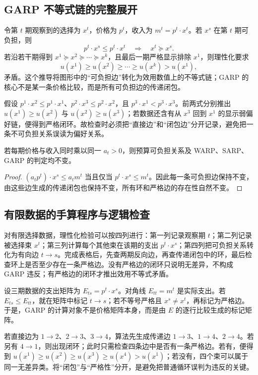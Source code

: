 \subsection{GARP 不等式链的完整展开}
令第 $t$ 期观察到的选择为 $x^t$，价格为 $p^t$，收入为 $m^t=p^t\cdot x^t$。若 $x^s$ 在第 $t$ 期可负担，则
\[
 p^t\cdot x^s\le p^t\cdot x^t
 \quad\Longrightarrow\quad x^t\succeq x^s.
\]
若沿若干期得到 $x^1\succeq x^2\succeq\cdots\succeq x^k$，且最后一期严格显示排除 $x^1$，则理性化要求
\[
 u(x^1)\ge u(x^2)\ge\cdots\ge u(x^k)>u(x^1),
\]
矛盾。这个推导将图形中的“可负担边”转化为效用数值上的不等式链；GARP 的核心不是某一条价格比较，而是所有可负担边的传递闭包。

\begin{example}[三期链的逐项计算]
假设 $p^1\cdot x^2\le p^1\cdot x^1$、$p^2\cdot x^3\le p^2\cdot x^2$，且
$p^3\cdot x^1<p^3\cdot x^3$。前两式分别推出 $u(x^1)\ge u(x^2)$ 与
$u(x^2)\ge u(x^3)$；若数据还含有从 $x^3$ 回到 $x^1$ 的显示弱偏好链，便得到严格闭环。故检查时必须把“直接边”和“闭包边”分开记录，避免把一条不可负担关系误读为偏好关系。
\end{example}

\begin{proposition}[尺度变换不改变显示偏好]
若每期价格与收入同时乘以同一 $a_t>0$，则预算可负担关系及 WARP、SARP、GARP 的判定均不变。
\end{proposition}
\begin{proof}
$(a_tp^t)\cdot x^s\le a_tm^t$ 当且仅当 $p^t\cdot x^s\le m^t$。因此每一条可负担边保持不变，由这些边生成的传递闭包也保持不变，所有环和严格边的存在性自然不变。
\end{proof}

\subsection{有限数据的手算程序与逻辑检查}
对有限选择数据，理性化检验可以按四列进行：第一列记录观察期 $t$；第二列记录被选择束 $x^t$；第三列计算每个其他束在该期的支出 $p^t\cdot x^s$；第四列把可负担关系转化为有向边 $t\to s$。完成表格后，先查两期反向边，再查传递闭包中的环，最后检查环上是否至少存在一条严格边。没有严格边的闭环只说明无差异，不构成 GARP 违反；有严格边的闭环才推出效用不等式矛盾。

设三期数据的支出矩阵为 $E_{ts}=p^t\cdot x^s$。对角线 $E_{tt}=m^t$ 是实际支出。若 $E_{ts}\le E_{tt}$，就在矩阵中标记 $t\to s$；若不等号严格且 $x^s\ne x^t$，再标记为严格边。于是，GARP 的计算对象不是价格矩阵本身，而是由 $E$ 的逐行比较生成的标记矩阵。

\begin{example}[四期闭包的检查顺序]
若直接边为 $1\to2$、$2\to3$、$3\to4$，算法先生成传递边 $1\to3$、$1\to4$、$2\to4$。若另有 $4\to1$，则出现闭环；此时只需检查四条边中是否有一条严格边。若有，便得到 $u(x^1)\ge u(x^2)\ge u(x^3)\ge u(x^4)>u(x^1)$；若没有，四个束可以属于同一无差异类。将“闭包”与“严格性”分开，是避免把普通循环误判为违反的关键。
\end{example}

